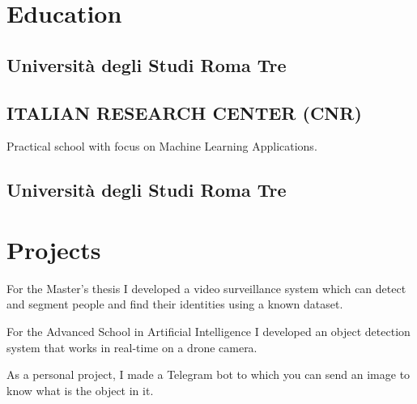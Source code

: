 \documentclass[]{deedy-resume-openfont}
\begin{document}
\begin{minipage}[t]{0.66\textwidth}

\section{Education} 

\subsection{Università degli Studi Roma Tre}
\sectionsep

\subsection{ITALIAN RESEARCH CENTER (CNR)}
Practical school with focus on Machine Learning Applications. \\
\sectionsep

\subsection{Università degli Studi Roma Tre}



\section{Projects}

For the Master's thesis I developed a video surveillance system which can detect and segment people and  find their identities using a known dataset.

For the Advanced School in Artificial Intelligence I developed an object detection system that works in real-time on a drone camera.

As a personal project, I made a Telegram bot to which you can send an image to know what is the object in it.


\end{minipage}
\end{document}
